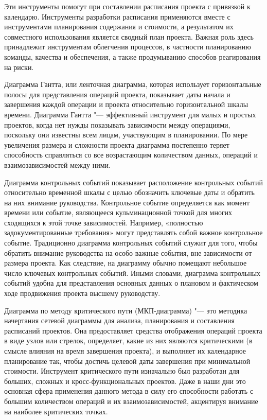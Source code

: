 \documentclass{../industrial-development}
\begin{document}
\lecturenotes

Эти инструменты помогут при составлении расписания проекта с привязкой к календарю. Инструменты разработки расписания применяются вместе с инструментами планирования содержания и стоимости, а результатом их совместного использования является сводный план проекта. Важная роль здесь принадлежит инструментам облегчения процессов, в частности планированию команды, качества и обеспечения, а также продумыванию способов реагирования на риски.

Диаграмма Гантта, или ленточная диаграмма, которая использует горизонтальные полосы для представления операций проекта, показывает даты начала и завершения каждой операции и проекта относительно горизонтальной шкалы времени. Диаграмма Гантта "--- эффективный инструмент для малых и простых проектов, когда нет нужды показывать зависимости между операциями, поскольку они известны всем лицам, участвующим в планировании. По мере увеличения размера и сложности проекта диаграмма постепенно теряет способность справляться со все возрастающим количеством данных, операций и взаимозависимостей между ними.

Диаграмма контрольных событий показывает расположение контрольных событий относительно временной шкалы с целью обозначить ключевые даты и обратить на них внимание руководства. Контрольное событие определяется как момент времени или событие, являющееся кульминационной точкой для многих сходящихся к этой точке зависимостей. Например, «полностью задокументированные требования» могут представлять собой важное контрольное
событие. Традиционно диаграмма контрольных событий служит для того, чтобы обратить внимание руководства на особо важные события, вне зависимости от размера проекта. Как следствие, на диаграмму обычно помещают небольшое число ключевых контрольных событий. Иными словами, диаграмма контрольных событий удобна для представления основных данных о плановом и фактическом ходе продвижения проекта высшему руководству.

Диаграмма по методу критического пути (МКП-диаграмма) "--- это методика начертания сетевой диаграммы для анализа, планирования и составления расписаний проектов. Она предоставляет средства отображения операций проекта в виде узлов или стрелок, определяет, какие из них являются критическими (в смысле влияния на время завершения проекта), и выполняет их календарное планирование так, чтобы достичь целевой даты завершения при минимальной стоимости. Инструмент критического пути изначально был разработан для больших, сложных и кросс-функциональных проектов. Даже в наши дни это основная сфера применения данного метода в силу его способности работать с большим количеством операций и их взаимозависимостей, акцентируя внимание на наиболее критических точках.
\end{document}
